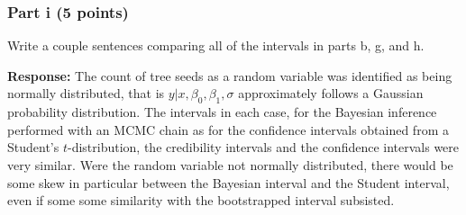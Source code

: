 \documentclass[
]{article}
\begin{document}
\hypertarget{part-i-5-points}{%
\subsubsection{Part i (5 points)}\label{part-i-5-points}}

Write a couple sentences comparing all of the intervals in parts b, g,
and h.

\textbf{Response:} The count of tree seeds as a random variable was
identified as being normally distributed, that is
\(y|x,\beta_0,\beta_1,\sigma\) approximately follows a Gaussian
probability distribution. The intervals in each case, for the Bayesian
inference performed with an MCMC chain as for the confidence intervals
obtained from a Student's \(t\)-distribution, the credibility intervals
and the confidence intervals were very similar. Were the random variable
not normally distributed, there would be some skew in particular between
the Bayesian interval and the Student interval, even if some some
similarity with the bootstrapped interval subsisted.
\end{document}
